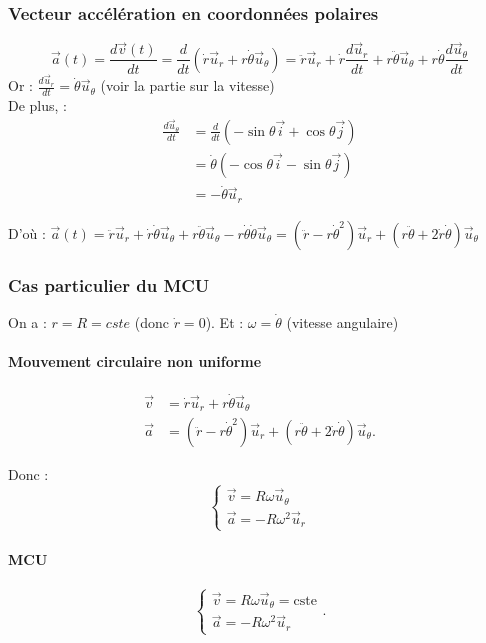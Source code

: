\documentclass{article}
\begin{document}
\subsubsection{Vecteur accélération en coordonnées polaires}

\[
\vec{a}(t) = \frac{d\vec{v}(t)}{dt} = \frac{d}{dt} (\dot{r}\vec{u}_r + r\dot{\theta}\vec{u}_\theta) = \ddot{r} \vec{u}_r + \dot{r}\frac{d\vec{u}_r}{dt} +r\ddot{\theta}\vec{u}_\theta + r\dot{\theta}\frac{d\vec{u}_\theta}{dt}
\]
Or : $\frac{d\vec{u}_r}{dt} = \dot{\theta}\vec{u}_\theta$ (voir la partie sur la vitesse)\\
De plus, : 
\begin{align*}
    \frac{d\vec{u}_\theta}{dt} &= \frac{d}{dt}(-\sin\theta\vec{i}+\cos\theta\vec{j}) \\
    &= \dot{\theta}(-\cos\theta \vec{i} - \sin\theta\vec{j}) \\
    &= -\dot{\theta}\vec{u}_r
\end{align*}

D'où : $\vec{a}(t) = \ddot{r}\vec{u}_r +\dot{r}\dot{\theta}\vec{u}_\theta + r\ddot{\theta}\vec{u}_\theta -r\dot{\theta}\dot{\theta}\vec{u}_\theta = (\ddot{r}-r\dot{\theta}^2)\vec{u}_r + (r\ddot{\theta}+2\dot{r}\dot{\theta})\vec{u}_\theta$

\subsubsection{Cas particulier du MCU}
On a  : $r = R = cste $ (donc $\dot{r} = 0$). Et :  $\omega = \dot{\theta}$ (vitesse angulaire)

\paragraph{Mouvement circulaire non uniforme}

\begin{align*}
    \vec{v}&= \dot{r}\vec{u}_r + r\dot{\theta}\vec{u}_\theta\\
    \vec{a}&=  (\ddot{r}-r\dot{\theta}^2)\vec{u}_r + (r\ddot{\theta}+2\dot{r}\dot{\theta})\vec{u}_\theta
.\end{align*}

Donc : \\
\[
\begin{cases}
    \vec{v} = R\omega\vec{u}_\theta\\
    \vec{a} = -R \omega^2\vec{u}_r
\end{cases}\]

\paragraph{MCU}
\[
\begin{cases}
    \vec{v} = R\omega\vec{u}_\theta = \text{cste} \\
    \vec{a} = -R \omega^2\vec{u}_r
\end{cases}
.\] 
\end{document}
